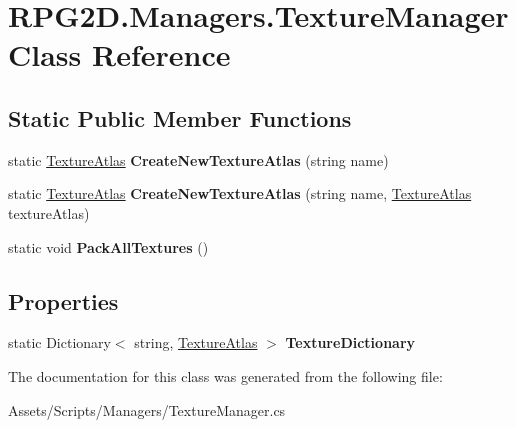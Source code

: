 \hypertarget{class_r_p_g2_d_1_1_managers_1_1_texture_manager}{}\section{R\+P\+G2\+D.\+Managers.\+Texture\+Manager Class Reference}
\label{class_r_p_g2_d_1_1_managers_1_1_texture_manager}
\subsection*{Static Public Member Functions}
\begin{DoxyCompactItemize}
\item 
\mbox{\label{class_r_p_g2_d_1_1_managers_1_1_texture_manager_acb2f5101ac3ee154b8a3f577c4c9594a}} 
static \mbox{\hyperlink{class_r_p_g2_d_1_1_texture_atlas}{Texture\+Atlas}} {\bfseries Create\+New\+Texture\+Atlas} (string name)
\item 
\mbox{\label{class_r_p_g2_d_1_1_managers_1_1_texture_manager_af0ee0ac25113fa5fc0f2888c1d57eea5}} 
static \mbox{\hyperlink{class_r_p_g2_d_1_1_texture_atlas}{Texture\+Atlas}} {\bfseries Create\+New\+Texture\+Atlas} (string name, \mbox{\hyperlink{class_r_p_g2_d_1_1_texture_atlas}{Texture\+Atlas}} texture\+Atlas)
\item 
\mbox{\label{class_r_p_g2_d_1_1_managers_1_1_texture_manager_a1acd65db8c3ffffe820d8145904e7638}} 
static void {\bfseries Pack\+All\+Textures} ()
\end{DoxyCompactItemize}
\subsection*{Properties}
\begin{DoxyCompactItemize}
\item 
\mbox{\label{class_r_p_g2_d_1_1_managers_1_1_texture_manager_a5364597d24acc20f4020da31ae8bf4a4}} 
static Dictionary$<$ string, \mbox{\hyperlink{class_r_p_g2_d_1_1_texture_atlas}{Texture\+Atlas}} $>$ {\bfseries Texture\+Dictionary}
\end{DoxyCompactItemize}


The documentation for this class was generated from the following file\+:\begin{DoxyCompactItemize}
\item 
Assets/\+Scripts/\+Managers/Texture\+Manager.\+cs\end{DoxyCompactItemize}

